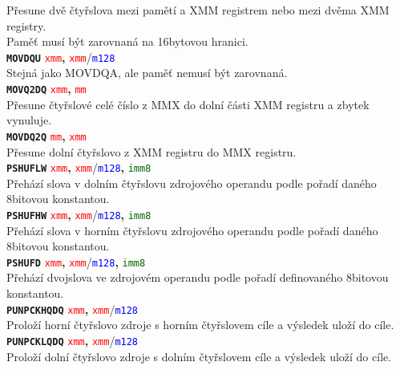 \documentclass[
]{cz_sablona}
\newcommand{\reg}[1]{\texttt{\textcolor{red}{#1}}}
\newcommand{\mem}[1]{\texttt{\textcolor{blue}{#1}}}
\newcommand{\const}[1]{\texttt{\textcolor{darkgreen}{#1}}}
\newcommand{\instr}[1]{\texttt{\textbf{#1}}}
\begin{document}
Přesune dvě čtyřslova mezi pamětí a XMM registrem nebo mezi dvěma XMM registry.\\
Paměť musí být zarovnaná na 16bytovou hranici.\\[0.5em]
\instr{MOVDQU} \reg{xmm}\textbf{,} \reg{xmm}/\mem{m128}\\
Stejná jako MOVDQA, ale paměť nemusí být zarovnaná.\\[0.5em]
\instr{MOVQ2DQ} \reg{xmm}\textbf{,} \reg{mm}\\
Přesune čtyřslové celé číslo z MMX do dolní části XMM registru a zbytek vynuluje.\\[0.5em]
\instr{MOVDQ2Q} \reg{mm}\textbf{,} \reg{xmm}\\
Přesune dolní čtyřslovo z XMM registru do MMX registru.\\[0.5em]
\instr{PSHUFLW} \reg{xmm}\textbf{,} \reg{xmm}/\mem{m128}\textbf{,} \const{imm8}\\
Přehází slova v dolním čtyřslovu zdrojového operandu podle pořadí daného 8bitovou konstantou.\\[0.5em]
\instr{PSHUFHW} \reg{xmm}\textbf{,} \reg{xmm}/\mem{m128}\textbf{,} \const{imm8}\\
Přehází slova v horním čtyřslovu zdrojového operandu podle pořadí daného 8bitovou konstantou.\\[0.5em]
\instr{PSHUFD} \reg{xmm}\textbf{,} \reg{xmm}/\mem{m128}\textbf{,} \const{imm8}\\
Přehází dvojslova ve zdrojovém operandu podle pořadí definovaného 8bitovou konstantou.\\[0.5em]
\instr{PUNPCKHQDQ} \reg{xmm}\textbf{,} \reg{xmm}/\mem{m128}\\
Proloží horní čtyřslovo zdroje s horním čtyřslovem cíle a výsledek uloží do cíle.\\[0.5em]
\instr{PUNPCKLQDQ} \reg{xmm}\textbf{,} \reg{xmm}/\mem{m128}\\
Proloží dolní čtyřslovo zdroje s dolním čtyřslovem cíle a výsledek uloží do cíle.
\end{document}
